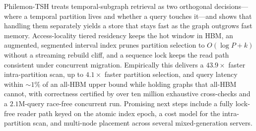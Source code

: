 \documentclass[10pt]{article}
\theoremstyle{definition}
\begin{document}
Philemon-TSH treats temporal-subgraph retrieval as two orthogonal decisions---where
a temporal partition lives and whether a query touches it---and shows that handling
them separately yields a store that stays fast as the graph outgrows fast memory.
Access-locality tiered residency keeps the hot window in HBM, an augmented,
segmented interval index prunes partition selection to $O(\log P + k)$ without a
streaming rebuild cliff, and a sequence lock keeps the read path consistent under
concurrent migration. Empirically this delivers a $43.9\times$ faster intra-partition
scan, up to $4.1\times$ faster partition selection, and query latency within
${\sim}1\%$ of an all-HBM upper bound while holding graphs that all-HBM cannot, with
correctness certified by over ten million exhaustive cross-checks and a
$2.1$M-query race-free concurrent run. Promising next steps include a fully
lock-free reader path keyed on the atomic index epoch, a cost model for the
intra-partition scan, and multi-node placement across several mixed-generation
servers.



\end{document}

